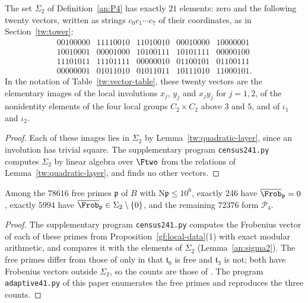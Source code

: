 \begin{lemma}\label{an:sigma2}
The set $\Sigma_2$ of Definition~\ref{an:P4} has exactly $21$ elements: zero
and the following twenty vectors, written as strings $c_0c_1\cdots c_7$ of
their coordinates, as in Section~\ref{tw:tower}:
\[
\begin{array}{ccccc}
 00100000&11110010&11010010&00010000&10000001\\
 10010001&00001000&10100111&10101111&00000100\\
 11101011&11101111&00000010&01100101&01100111\\
 00000001&01011010&01011011&10111010&11000101.
\end{array}
\]
In the notation of Table~\ref{tw:vector-table}, these twenty vectors are the
elementary images of the local involutions $x_j$, $y_j$ and $x_jy_j$ for
$j=1,2$, of the nonidentity elements of the four local groups
$C_2\times C_2$ above $3$ and $5$, and of $\iota_1$ and $\iota_2$.
\end{lemma}

\begin{proof}
Each of these images lies in $\Sigma_2$ by Lemma~\ref{tw:quadratic-layer},
since an involution has trivial square. The supplementary program
\texttt{census241.py} computes $\Sigma_2$ by linear algebra over $\Ftwo$
from the relations of Lemma~\ref{tw:quadratic-layer}, and finds no other
vectors.
\end{proof}

\begin{proposition}\label{an:census-prop}
Among the $78616$ free primes
$\mathfrak p$ of $B$ with $\mathrm N\mathfrak p\le10^6$, exactly $246$ have
$\overline{\Frob}_{\mathfrak p}=0$, exactly $5994$ have
$\overline{\Frob}_{\mathfrak p}\in\Sigma_2\setminus\{0\}$, and the remaining $72376$ form
$\mathcal P_4$.
\end{proposition}

\begin{proof}
The supplementary program \texttt{census241.py} computes the Frobenius
vector of each of these primes from Proposition~\ref{gf:local-data}(1) with
exact modular arithmetic, and compares it with the elements of $\Sigma_2$
(Lemma~\ref{an:sigma2}). The free primes differ from those of
\cite{Naslund04273} only in that $\mathfrak t_0$ is free and $\mathfrak t_3$
is not; both have Frobenius vectors outside $\Sigma_2$, so the counts are those
of \cite{Naslund04273}. The program \texttt{adaptive41.py} of this paper
enumerates the free primes and reproduces the three counts.
\end{proof}

